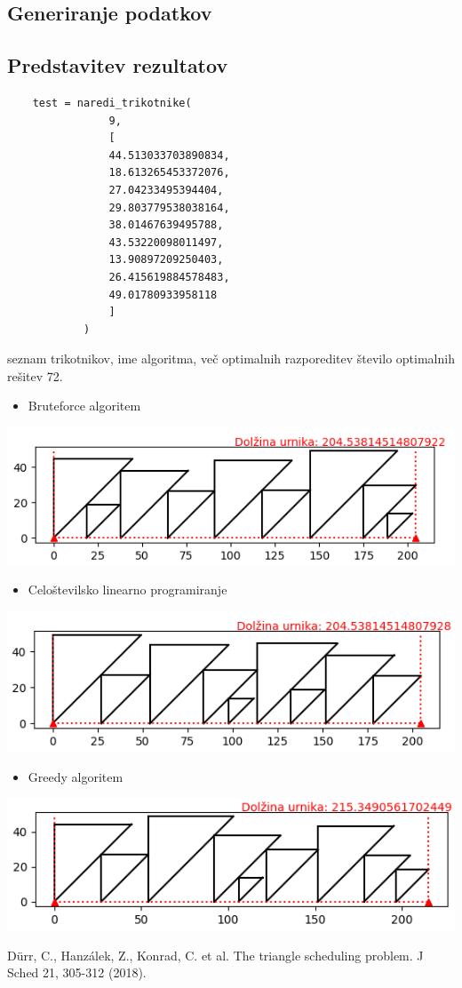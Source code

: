\documentclass[a4paper,12pt]{article}
\theoremstyle{definition}
\theoremstyle{plain}
\begin{document}
\subsection{Generiranje podatkov}

\subsection{Predstavitev rezultatov}
\begin{verbatim}
    test = naredi_trikotnike(
                9,
                [ 
                44.513033703890834,
                18.613265453372076,
                27.04233495394404,
                29.803779538038164,
                38.01467639495788,
                43.53220098011497,
                13.90897209250403,
                26.415619884578483,
                49.01780933958118
                ]
            )
\end{verbatim}

seznam trikotnikov, ime algoritma, več optimalnih razporeditev 
število optimalnih rešitev 72. \\

\begin{itemize}
    \item Bruteforce algoritem
\end{itemize}    
    \includegraphics[]{sim_brut.png}
    \begin{itemize}
    \item Celoštevilsko linearno programiranje
\end{itemize}    
    \includegraphics[]{sim_clp.png}
    \begin{itemize}
    \item Greedy algoritem
\end{itemize}    
    \includegraphics[]{sim_greedy.png}


    \begin{thebibliography}{9}


        
          Dürr, C., Hanzálek, Z., Konrad, C. et al. The triangle scheduling problem. J Sched 21, 305-312 (2018).

        \end{thebibliography}
\end{document}
